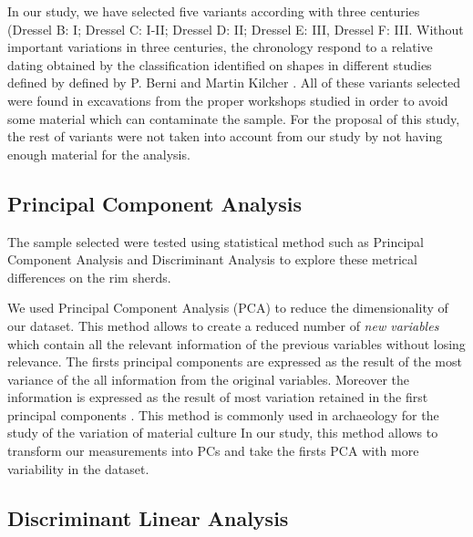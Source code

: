 \documentclass[review]{elsarticle}
\begin{document}
In our study, we have selected five variants according with three centuries
(Dressel B: I; Dressel C: I-II; Dressel D: II; Dressel E: III, Dressel F: III. Without important variations in three centuries, the chronology respond to a relative dating obtained by the classification identified on shapes in different studies defined by defined by P. Berni \citep{berni_millet_epigrafianforica_2008} and Martin Kilcher \citep{martin-kilcher_romischen_1994}. All of these variants selected were found in excavations from the proper workshops studied in order to avoid some material which can contaminate the sample. For the proposal of this study, the rest of variants were not taken into account from our study by not having enough material for the analysis. 


\subsection{Principal Component Analysis}

The sample selected were tested using statistical method such as Principal Component Analysis and Discriminant Analysis to explore these metrical differences on the rim sherds. 

We used Principal Component Analysis (PCA) to reduce the dimensionality of our dataset. This method allows to create a reduced number of \textit{new variables} which contain all the relevant information of the previous variables without losing relevance. The firsts principal components are expressed as the result of the most variance of the all information from the original variables. Moreover the information is expressed as the result of most variation retained in the first principal components \citep{jolliffe_principal_2002, shennan_quantifying_1997}. 
This method is commonly used in archaeology for the study of the variation of material culture \citep{li_crossbows_2014, schillinger_differences_2016} 
In our study, this method allows to transform our measurements into PCs and take the firsts PCA with more variability in the dataset.  


\subsection{Discriminant Linear Analysis} 
\end{document}
